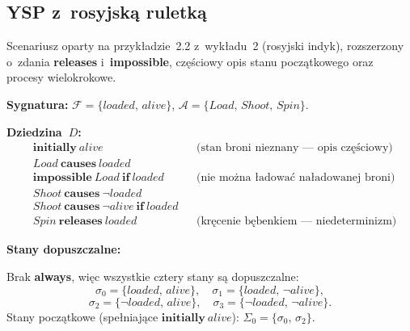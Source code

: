 \documentclass[11pt,a4paper]{article}
\newcommand{\causes}{\textbf{causes}}
\newcommand{\aft}{\textbf{after}}
\renewcommand{\iff}{\textbf{if}}
\newcommand{\initially}{\textbf{initially}}
\newcommand{\always}{\textbf{always}}
\newcommand{\impossible}{\textbf{impossible}}
\newcommand{\releases}{\textbf{releases}}
\begin{document}
\subsection{YSP z~rosyjską ruletką}
\noindent Scenariusz oparty na przykładzie~2.2 z~wykładu~2 (rosyjski indyk),
rozszerzony o~zdania \releases{} i~\impossible{}, częściowy opis stanu
początkowego oraz procesy wielokrokowe.

\medskip
\noindent\textbf{Sygnatura:}
$\mathcal{F} = \{\mathit{loaded},\, \mathit{alive}\}$, \quad
$\mathcal{A} = \{\mathit{Load},\, \mathit{Shoot},\, \mathit{Spin}\}$.

\medskip
\noindent\textbf{Dziedzina~$D$:}
\begin{align*}
  &\initially\ \mathit{alive}
    && \text{(stan broni nieznany --- opis częściowy)} \\
  &\mathit{Load}\ \causes\ \mathit{loaded}
    && \\
  &\impossible\ \mathit{Load}\ \iff\ \mathit{loaded}
    && \text{(nie można ładować naładowanej broni)} \\
  &\mathit{Shoot}\ \causes\ \neg\mathit{loaded}
    && \\
  &\mathit{Shoot}\ \causes\ \neg\mathit{alive}\ \iff\ \mathit{loaded}
    && \\
  &\mathit{Spin}\ \releases\ \mathit{loaded}
    && \text{(kręcenie bębenkiem --- niedeterminizm)}
\end{align*}


\medskip
\noindent\textbf{Stany dopuszczalne:}

Brak \always{}, więc wszystkie cztery stany są dopuszczalne:
\[
  \sigma_0 = \{\mathit{loaded},\,\mathit{alive}\}, \quad
  \sigma_1 = \{\mathit{loaded},\,\neg\mathit{alive}\},
\]
\[
  \sigma_2 = \{\neg\mathit{loaded},\,\mathit{alive}\}, \quad
  \sigma_3 = \{\neg\mathit{loaded},\,\neg\mathit{alive}\}.
\]
Stany początkowe (spełniające $\initially\ \mathit{alive}$):
$\Sigma_0 = \{\sigma_0,\, \sigma_2\}$.

\end{document}
